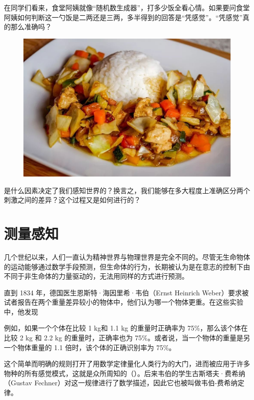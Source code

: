 \ADyixuehui

\newpage

\begin{multicols}{2}
在同学们看来，食堂阿姨就像“随机数生成器”，打多少饭全看心情。如果要问食堂阿姨如何判断这一勺饭是二两还是三两，多半得到的回答是“凭感觉”。“凭感觉”真的那么准确吗？
\begin{figure}[H]
\centering
\includegraphics[width=\linewidth]{IMG/201909/190902}
\end{figure}


是什么因素决定了我们感知世界的？换言之，我们能够在多大程度上准确区分两个刺激之间的差异？这个过程又是如何进行的？

\section*{测量感知}

几个世纪以来，人们一直认为精神世界与物理世界是完全不同的。尽管无生命物体的运动能够通过数学手段预测，但生命体的行为，长期被认为是在意志的控制下由不同于非生命体的力量驱动的，无法用同样的方式进行预测。

直到 1834 年，德国医生恩斯特·海因里希·韦伯（Ernst Heinrich Weber）要求被试者报告在两个重量差异较小的物体中，他们认为哪一个物体更重。在这些实验中，他发现

例如，如果一个个体在比较 1 kg和 1.1 kg 的重量时正确率为 75\%，那么该个体在比较 2 kg 和 2.2 kg 的重量时，正确率也为 75\%。或者说，当一个物体的重量是另一个物体重量的 1.1 倍时，该个体的正确识别率为 75\%。

这个简单而明确的规则打开了用数学定律量化人类行为的大门，进而被应用于许多物种的所有感觉模式，这就是众所周知的（）。后来韦伯的学生古斯塔夫·费希纳（Gustav Fechner）对这一规律进行了数学描述，因此它也被叫做韦伯-费希纳定律。


\end{multicols}
